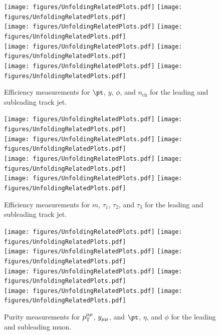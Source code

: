 \begin{figure}[h!]
  \centering
  \texttt{[image: figures/UnfoldingRelatedPlots.pdf]}
  \texttt{[image: figures/UnfoldingRelatedPlots.pdf]} \\
  \texttt{[image: figures/UnfoldingRelatedPlots.pdf]}
  \texttt{[image: figures/UnfoldingRelatedPlots.pdf]} \\
  \texttt{[image: figures/UnfoldingRelatedPlots.pdf]}
  \texttt{[image: figures/UnfoldingRelatedPlots.pdf]} \\
  \texttt{[image: figures/UnfoldingRelatedPlots.pdf]}
  \texttt{[image: figures/UnfoldingRelatedPlots.pdf]}
  \caption{Efficiency measurements for $\pt$, $y$, $\phi$, and $n_{\text{ch}}$ for the leading and subleading track jet.}
  \label{fig:EffTJ1}
\end{figure}

\begin{figure}[h!]
  \centering
  \texttt{[image: figures/UnfoldingRelatedPlots.pdf]}
  \texttt{[image: figures/UnfoldingRelatedPlots.pdf]} \\
  \texttt{[image: figures/UnfoldingRelatedPlots.pdf]}
  \texttt{[image: figures/UnfoldingRelatedPlots.pdf]} \\
  \texttt{[image: figures/UnfoldingRelatedPlots.pdf]}
  \texttt{[image: figures/UnfoldingRelatedPlots.pdf]} \\
  \texttt{[image: figures/UnfoldingRelatedPlots.pdf]}
  \texttt{[image: figures/UnfoldingRelatedPlots.pdf]}
  \caption{Efficiency measurements for $m$, $\tau_1$, $\tau_2$, and $\tau_3$ for the leading and subleading track jet.}
  \label{fig:EffTJ2}
\end{figure}

\begin{figure}[h!]
  \centering
  \texttt{[image: figures/UnfoldingRelatedPlots.pdf]}
  \texttt{[image: figures/UnfoldingRelatedPlots.pdf]} \\
  \texttt{[image: figures/UnfoldingRelatedPlots.pdf]}
  \texttt{[image: figures/UnfoldingRelatedPlots.pdf]} \\
  \texttt{[image: figures/UnfoldingRelatedPlots.pdf]}
  \texttt{[image: figures/UnfoldingRelatedPlots.pdf]} \\
  \texttt{[image: figures/UnfoldingRelatedPlots.pdf]}
  \texttt{[image: figures/UnfoldingRelatedPlots.pdf]}
  \caption{Purity measurements for $p_\mathrm{T}^{\mu\mu}$, $y_{\mu\mu}$, and $\pt$, $\eta$, and $\phi$ for the leading and subleading muon.}
  \label{fig:PurDilep}
\end{figure}

